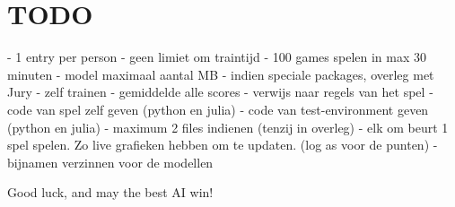 \documentclass[11pt]{article}
\begin{document}
\section{TODO}
- 1 entry per person
- geen limiet om traintijd
- 100 games spelen in max 30 minuten
- model maximaal aantal MB
- indien speciale packages, overleg met Jury
- zelf trainen
- gemiddelde alle scores
- verwijs naar regels van het spel
- code van spel zelf geven (python en julia)
- code van test-environment geven (python en julia)
- maximum 2 files indienen (tenzij in overleg)
- elk om beurt 1 spel spelen. Zo live grafieken hebben om te updaten. (log as voor de punten)
- bijnamen verzinnen voor de modellen

Good luck, and may the best AI win!
\end{document}
